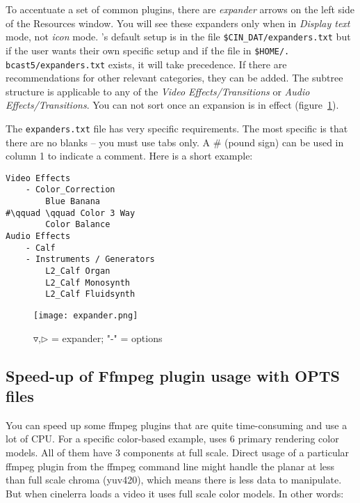 To accentuate a set of common plugins, there are \textit{expander} arrows on the left side of the Resources window. You will see these expanders only when in \textit{Display text} mode, not \textit{icon} mode.
\CGG{}’s default setup is in the file \texttt{\$CIN\_DAT/expan\-ders.txt} but if the user wants their own specific setup and if the file in \texttt{\$HOME/.\\bcast5/expanders.txt} exists, it will take precedence.
If there are recommendations for other relevant categories, they can be added. The subtree structure is applicable to any of the \textit{Video Effects/Transitions} or \textit{Audio Effects/Transitions}. You can not sort once an expansion is in effect (figure~\ref{fig:expander}).

The \texttt{expanders.txt} file has very specific requirements. The most specific is that there are no blanks -- you must use tabs only. A \# (pound sign) can be used in column 1 to indicate a comment. Here is a short example:

\begin{lstlisting}[style=sh]
Video Effects
    - Color_Correction
        Blue Banana
#\qquad \qquad Color 3 Way
        Color Balance
Audio Effects
    - Calf
    - Instruments / Generators
        L2_Calf Organ
        L2_Calf Monosynth
        L2_Calf Fluidsynth
\end{lstlisting}

\begin{figure}[htpb]
    \centering
    \texttt{[image: expander.png]}
    \caption{$\triangledown$,$\triangleright$ = expander; "-" = options}
    \label{fig:expander}
\end{figure}

\subsection{Speed-up of Ffmpeg plugin usage with OPTS files}%
\label{sub:speedup_ffmpeg_plugin_opts}

You can speed up some ffmpeg plugins that are quite time-consuming and use a lot of CPU\@. For a specific color-based example, \CGG{} uses 6 primary rendering color models. All of them have 3 components at full scale. Direct usage of a particular ffmpeg plugin from the ffmpeg command line might handle the planar at less than full scale chroma (yuv420), which means there is less data to manipulate. But when cinelerra loads a video it uses full scale color models. In other words:

